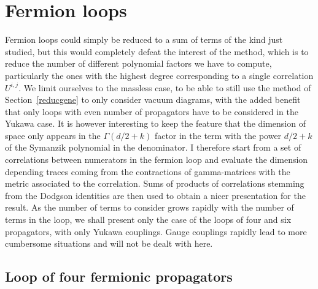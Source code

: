 \documentclass[pdftex]{sigma}
\numberwithin{equation}{section}
\begin{document}
\section{Fermion loops}
Fermion loops could simply be reduced to a sum of terms of the kind just studied, but this would
completely defeat the interest of the method, which is to reduce the number of different polynomial factors
we have to compute, particularly the ones with the highest degree corresponding to a single correlation
$U^{i,j}$. We limit ourselves to the massless case, to be able to still use the method of Section~\ref{reducgene} to only
consider vacuum diagrams, with the added benefit that only loops with even number of propagators have to be considered in
the Yukawa case.
It is however interesting to keep the feature that the dimension of space only appears in the
$\Gamma(d/2+k)$ factor in the term with the power $d/2+k$ of the Symanzik polynomial in the denominator.
I therefore start from a set of correlations between numerators in the fermion loop and evaluate
the dimension depending traces coming from the contractions of gamma-matrices with the metric
associated to the correlation. Sums of products of correlations stemming
from the Dodgson identities are then used to obtain a nicer presentation for the result. As the number of terms to consider
grows rapidly with the number of terms in the loop, we shall present only the case of the loops of
four and six propagators, with only Yukawa couplings. Gauge couplings rapidly lead to more
cumbersome situations and will not be dealt with here.

\subsection{Loop of four fermionic propagators} \label{fourdirac}
\end{document}
